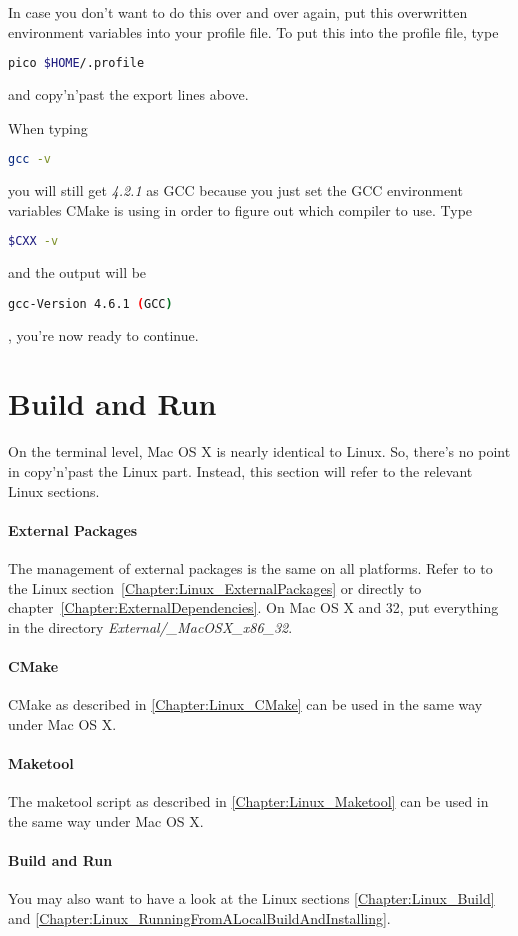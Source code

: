 In case you don't want to do this over and over again, put this overwritten environment variables into your profile file. To put this into the profile file, type
\begin{lstlisting}[language=sh]
pico $HOME/.profile
\end{lstlisting}
and copy'n'past the export lines above.

When typing
\begin{lstlisting}[language=sh]
gcc -v
\end{lstlisting}
you will still get \emph{4.2.1} as \ac{GCC} because you just set the \ac{GCC} environment variables CMake is using in order to figure out which compiler to use. Type
\begin{lstlisting}[language=sh]
$CXX -v
\end{lstlisting}
and the output will be
\begin{lstlisting}[language=sh]
gcc-Version 4.6.1 (GCC)
\end{lstlisting}
, you're now ready to continue.



\section{Build and Run}
On the terminal level, Mac OS X is nearly identical to Linux. So, there's no point in copy'n'past the Linux part. Instead, this section will refer to the relevant Linux sections.


\paragraph{External Packages}
The management of external packages is the same on all platforms. Refer to to the Linux section~\ref{Chapter:Linux_ExternalPackages} or directly to chapter~\ref{Chapter:ExternalDependencies}. On Mac OS X and \SI{32}{\bit}, put everything in the directory \emph{External/\_MacOSX\_x86\_32}.


\paragraph{CMake}
CMake as described in \ref{Chapter:Linux_CMake} can be used in the same way under Mac OS X.


\paragraph{Maketool}
The maketool script as described in \ref{Chapter:Linux_Maketool} can be used in the same way under Mac OS X.


\paragraph{Build and Run}
You may also want to have a look at the Linux sections \ref{Chapter:Linux_Build} and \ref{Chapter:Linux_RunningFromALocalBuildAndInstalling}.
